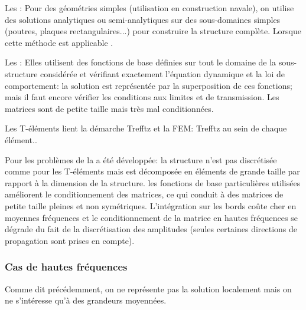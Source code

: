 \bigskip
Les : Pour des géométries simples (utilisation en construction navale), on utilise des solutions analytiques ou semi-analytiques sur des sous-domaines simples (poutres, plaques rectangulaires...) pour construire la structure complète. Lorsque cette méthode est applicable .

\bigskip
Les : Elles utilisent des fonctions de base définies sur tout le domaine de la sous-structure considérée et vérifiant exactement l'équation dynamique et la loi de comportement: la solution est représentée par la superposition de ces fonctions; mais il faut encore vérifier les conditions aux limites et de transmission. Les matrices sont de petite taille mais très mal conditionnées.

Les T-éléments lient la démarche Trefftz et la FEM: Trefftz au sein de chaque élément..

Pour les problèmes de  la  a été développée: la structure n'est pas discrétisée comme pour les T-éléments mais est décomposée en éléments de grande taille par rapport à la dimension de la structure. les fonctions de base particulières utilisées améliorent le conditionnement des matrices, ce qui conduit à des matrices de petite taille pleines et non symétriques. L'intégration sur les bords coûte cher en moyennes fréquences et le conditionnement de la matrice en hautes fréquences se dégrade du fait de la discrétisation des amplitudes (seules certaines directions de propagation sont prises en compte).

\medskip
\subsubsection{Cas de hautes fréquences}

Comme dit précédemment, on ne représente pas la solution localement mais on ne s'intéresse qu'à des grandeurs moyennées.

